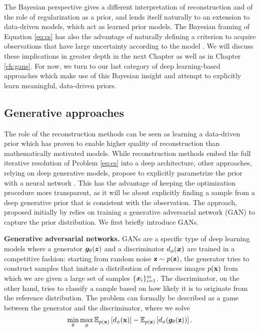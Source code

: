The Bayesian perspective gives a different interpretation of reconstruction and of the role of regularization as a prior, and lends itself naturally to an extension to data-driven models, which act as learned prior models. The Bayesian framing of Equation \ref{eq:cs} has also the advantage of naturally defining a criterion to acquire observations that have large uncertainty according to the model \citep{ji2008bayesian}. We will discuss these implications in greater depth in the next Chapter as well as in Chapter \ref{ch:gans}. For now, we turn to our last category of deep learning-based approaches which make use of this Bayesian insight and attempt to explicitly learn meaningful, data-driven priors. 

\subsection{Generative approaches}\label{ss:generative}
The role of the reconstruction methods can be seen as learning a data-driven prior which has proven to enable higher quality of reconstruction than mathematically motivated models. While reconstruction methods embed the full iterative resolution of Problem \ref{eq:cs} into a deep architecture, other approaches, relying on deep generative models, propose to explicitly parametrize the prior with a neural network \citep{bora2017compressed, jalal2021robust, patel2021gan}. This has the advantage of keeping the optimization procedure more transparent, as it will be about explicitly finding a sample from a deep generative prior that is consistent with the observation. The approach, proposed initially by \citet{bora2017compressed} relies on training a generative adversarial network (GAN) to capture the prior distribution. We first briefly introduce GANs.

\textbf{Generative adversarial networks.} GANs \citep{goodfellow2014generative} are a specific type of deep learning models where a generator ${\bm{g}}_\theta({\bm{z}})$ and a discriminator $d_\phi({\bm{x}})$ are trained in a competitive fashion: starting from random noise ${\mathbf{z}} \sim p({\mathbf{z}})$, the generator tries to construct samples that imitate a distribution of references images $p({\mathbf{x}})$ from which we are given a large set of samples $\{{\bm{x}}_i\}_{i=1}^m$. The discriminator, on the other hand, tries to classify a sample based on how likely it is to originate from the reference distribution. The problem can formally be described as a game between the generator and the discriminator, where we solve
\begin{equation}
    \min_{\theta} \max_{\phi} \mathbb{E}_{p({\mathbf{x}})}\left[d_\phi({\mathbf{x}})\right] - \mathbb{E}_{p({\mathbf{z}})}\left[d_\phi({\bm{g}}_\theta({\mathbf{z}}))\right].\label{eq:gan}
\end{equation} 

